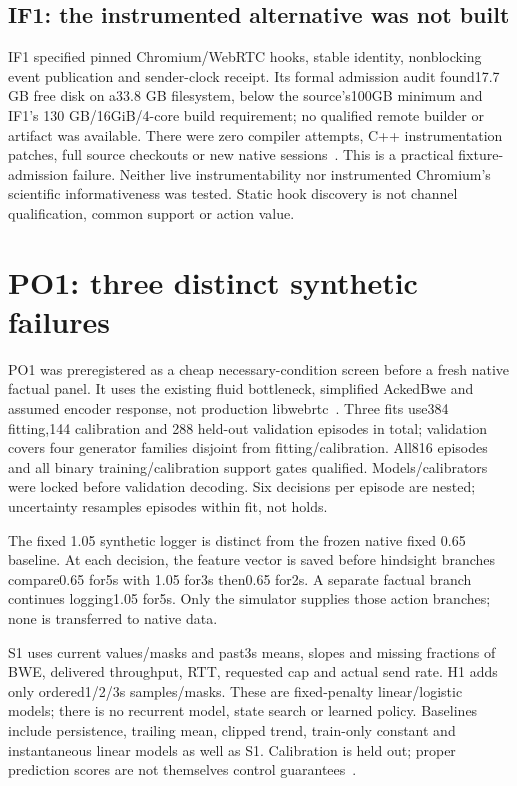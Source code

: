 \documentclass[10pt]{article}
\begin{document}
\subsection{IF1: the instrumented alternative was not built}
IF1 specified pinned Chromium/WebRTC hooks, stable identity, nonblocking event
publication and sender-clock receipt. Its formal admission audit found17.7 GB
free disk on a33.8 GB filesystem, below the source's100GB minimum and IF1's
130 GB/16GiB/4-core build requirement; no qualified remote builder or artifact
was available. There were zero compiler attempts, C++ instrumentation patches,
full source checkouts or new native sessions~\cite{if1}. This is a practical
fixture-admission failure. Neither live instrumentability nor instrumented
Chromium's scientific informativeness was tested. Static hook discovery is not
channel qualification, common support or action value.

\section{PO1: three distinct synthetic failures}
\label{sec:po1}
PO1 was preregistered as a cheap necessary-condition screen before a fresh native
factual panel. It uses the existing fluid bottleneck, simplified AckedBwe and
assumed encoder response, not production libwebrtc~\cite{gcc,po1}. Three fits
use384 fitting,144 calibration and 288 held-out validation episodes in total;
validation covers four generator families disjoint from fitting/calibration.
All816 episodes and all binary training/calibration support gates qualified.
Models/calibrators were locked before validation decoding. Six decisions per
episode are nested; uncertainty resamples episodes within fit, not holds.

The fixed 1.05 synthetic logger is distinct from the frozen native fixed 0.65
baseline. At each decision, the feature vector is saved before hindsight
branches compare0.65 for5s with 1.05 for3s then0.65 for2s. A separate factual
branch continues logging1.05 for5s. Only the simulator supplies those action
branches; none is transferred to native data.

S1 uses current values/masks and past3s means, slopes and missing fractions of
BWE, delivered throughput, RTT, requested cap and actual send rate. H1 adds
only ordered1/2/3s samples/masks. These are fixed-penalty linear/logistic models;
there is no recurrent model, state search or learned policy. Baselines include
persistence, trailing mean, clipped trend, train-only constant and instantaneous
linear models as well as S1. Calibration is held out; proper prediction scores
are not themselves control guarantees~\cite{scoring,ovadia}.
\end{document}
